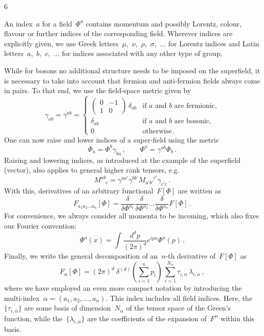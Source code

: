 6\documentclass[10pt,prd,nofootinbib,superscriptaddress,twocolumn]{revtex4-2}
\begin{document}
An index~$a$ for a field~$\Phi^a$ contains momentum and possibly Lorentz, colour, flavour or further indices of the corresponding field.
Wherever indices are explicitly given, we use Greek letters~$\mu$,~$\nu$,~$\rho$,~$\sigma$,~$\dotsc$ for Lorentz indices and Latin letters~$a$,~$b$,~$c$,~$\dotsc$ for indices associated with any other type of group. 

While for bosons no additional structure needs to be imposed on the superfield, it is necessary to take into account that fermion and anti-fermion fields always come in pairs.
To that end, we use the field-space metric given by
%
\begin{equation}
	\gamma_{ab} = \gamma^{ab} = \begin{cases}
		\begin{pmatrix}
			0 & -1 \\
			1 & 0
		\end{pmatrix}\,\delta_{ab}
		& \text{if $a$ and $b$ are fermionic,} \\[3ex]
		\delta_{ab} & \text{if $a$ and $b$ are bosonic,}   \\[2ex]
		0               & \text{otherwise} 
		\,.
	\end{cases}
\end{equation}
%
One can now raise and lower indices of a super-field using the metric
%
\begin{equation}
	\Phi_a = \Phi^b\gamma_{ba} \,,
	\quad \quad
	\Phi^a = \gamma^{ab}\Phi_b \,.
\end{equation}
%
Raising and lowering indices, as introduced at the example of the superfield (vector), also applies to general higher rank tensors, e.g.
%
\begin{equation}
	M^{ab}_{\phantom{ab}c} = \gamma^{aa'} \gamma^{bb'} M_{a'b'}^{\phantom{a'b'}c'} \gamma_{c'c}
	\,.
\end{equation}
%
With this, derivatives of an arbitrary functional~$F[\Phi]$ are written as
%
\begin{equation}
	F_{a_1 a_2 \ldots a_n}[\Phi] =
	\frac{\delta}{\delta \Phi^{a_1}} \frac{\delta}{\delta \Phi^{a_2}} \ldots \frac{\delta}{\delta \Phi^{a_n}} F[\Phi]
	\,.
	\label{eq:Falpha}
\end{equation}
%
For convenience, we always consider all momenta to be incoming, which also fixes our Fourier convention:
%
\begin{equation}
	\Phi^a(x) = \int \frac{d^d p}{(2\pi)^d} e^{ipx}\Phi^a(p)
	\,.
\end{equation}
%	
Finally, we write the general decomposition of an~$n$-th derivative of~$F[\Phi]$ as
%
\begin{equation}\label{eq:general_decomposition}
	F_{\alpha}[\Phi] = (2\pi)^d\ \delta^{(d)}\left( \sum_{i=1}^n p_i \right)\,
	\sum_{i=1}^{N_\alpha} \tau_{i,\alpha} \, \lambda_{i,\alpha}
	\,,
\end{equation}
%
where we have employed an even more compact notation by introducing the multi-index~$\alpha = (a_1, a_2, \ldots, a_n)$. 
This index includes all field indices.
Here, the~$\{\tau_{i,\alpha}\}$ are some basis of dimension~$N_\alpha$ of the tensor space of the Green's function, while the~$\{\lambda_{i,\alpha}\}$ are the coefficients of the expansion of~$F^\alpha$ within this basis.
\end{document}
